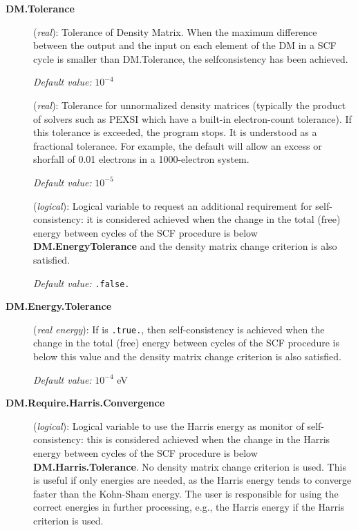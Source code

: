\begin{description}
\item[\textbf{DM.Tolerance}] (\textit{real}):
Tolerance of Density Matrix.
When the maximum difference between the output and the
input on each element of the DM
in a SCF cycle is smaller than DM.Tolerance,
the selfconsistency has been achieved.

\textit{Default value:} {$10^{-4}$}



\item[] (\textit{real}):
Tolerance for unnormalized density matrices (typically the product of
solvers such as PEXSI which have a built-in electron-count tolerance).
If this tolerance is exceeded, the program stops. It is understood as a
fractional tolerance. For example, the default will allow an excess or
shorfall of 0.01 electrons in a 1000-electron system.

\textit{Default value:} $10^{-5}$



\item[] (\textit{logical}):
   Logical variable to request an
  additional requirement for self-consistency: it is considered
  achieved when the change in the total (free) energy between cycles
  of the SCF procedure is below \textbf{DM.EnergyTolerance} and the
  density matrix change criterion is also satisfied.

\textit{Default value:} \texttt{.false.}

\item[\textbf{DM.Energy.Tolerance}] (\textit{real energy}):
   If  is \texttt{.true.}, then
  self-consistency is achieved when the change in the total (free)
  energy between cycles of the SCF procedure is below this value and
  the density matrix change criterion is also satisfied.

\textit{Default value:} {$10^{-4}$ eV}

\item[\textbf{DM.Require.Harris.Convergence}] (\textit{logical}):
Logical variable to use the Harris energy as monitor of
self-consistency: this is considered achieved when the change in the Harris energy between cycles
of the SCF procedure is below \textbf{DM.Harris.Tolerance}. No density
matrix change criterion is used.
This is useful if only energies are needed, as the Harris energy tends
to converge faster than the Kohn-Sham energy.
The user is responsible for using the correct energies in further
processing, e.g., the Harris energy if the Harris criterion is used.


\end{description}
